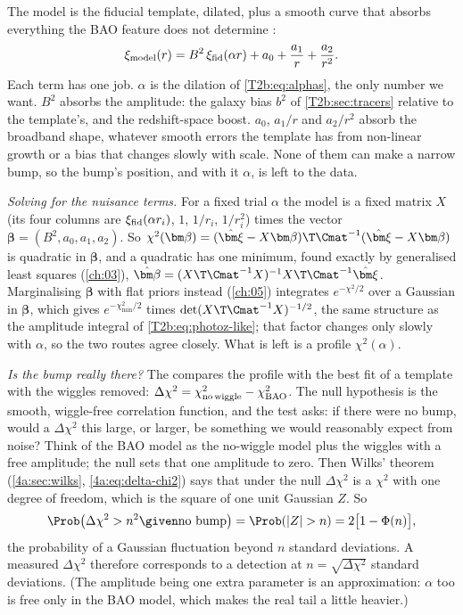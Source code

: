 The model is the fiducial template, dilated, plus a smooth curve that absorbs everything the BAO feature does not determine \cite[p.~9]{DESI2024VI}:
\begin{equation}
  \xi_{\rm model}(r)=B^2\,\xi_{\rm fid}(\alpha r)+a_0+\frac{a_1}{r}+\frac{a_2}{r^2}.
  \label{T2b:eq:bao-model}
\end{equation}
Each term has one job. $\alpha$ is the dilation of \eqref{T2b:eq:alphas}, the only number we want. $B^2$ absorbs the amplitude: the galaxy bias $b^2$ of \cref{T2b:sec:tracers} relative to the template's, and the redshift-space boost. $a_0$, $a_1/r$ and $a_2/r^2$ absorb the broadband shape, whatever smooth errors the template has from non-linear growth or a bias that changes slowly with scale. None of them can make a narrow bump, so the bump's position, and with it $\alpha$, is left to the data.

\emph{Solving for the nuisance terms.} For a fixed trial $\alpha$ the model is a fixed matrix $X$ (its four columns are $\xi_{\rm fid}(\alpha r_i)$, $1$, $1/r_i$, $1/r_i^2$) times the vector $\bm\beta=(B^2,a_0,a_1,a_2)$. So $\chi^2(\bm\beta)=(\hat{\bm\xi}-X\bm\beta)\T\Cmat^{-1}(\hat{\bm\xi}-X\bm\beta)$ is quadratic in $\bm\beta$, and a quadratic has one minimum, found exactly by generalised least squares (\cref{ch:03}), $\hat{\bm\beta}=(X\T\Cmat^{-1}X)^{-1}X\T\Cmat^{-1}\hat{\bm\xi}$. Marginalising $\bm\beta$ with flat priors instead (\cref{ch:05}) integrates $e^{-\chi^2/2}$ over a Gaussian in $\bm\beta$, which gives $e^{-\chi^2_{\min}/2}$ times $\det(X\T\Cmat^{-1}X)^{-1/2}$, the same structure as the amplitude integral of \eqref{T2b:eq:photoz-like}; that factor changes only slowly with $\alpha$, so the two routes agree closely. What is left is a profile $\chi^2(\alpha)$.

\emph{Is the bump really there?} The  compares the profile with the best fit of a template with the wiggles removed: $\Delta\chi^2=\chi^2_{\rm no\,wiggle}-\chi^2_{\rm BAO}$. The null hypothesis is the smooth, wiggle-free correlation function, and the test asks: if there were no bump, would a $\Delta\chi^2$ this large, or larger, be something we would reasonably expect from noise? Think of the BAO model as the no-wiggle model plus the wiggles with a free amplitude; the null sets that one amplitude to zero. Then Wilks' theorem (\cref{4a:sec:wilks}, \eqref{4a:eq:delta-chi2}) says that under the null $\Delta\chi^2$ is a $\chi^2$ with one degree of freedom, which is the square of one unit Gaussian $Z$. So
\[
  \Prob\big(\Delta\chi^2>n^2\given\text{no bump}\big)=\Prob(|Z|>n)=2\big[1-\Phi(n)\big],
\]
the probability of a Gaussian fluctuation beyond $n$ standard deviations. A measured $\Delta\chi^2$ therefore corresponds to a detection at $n=\sqrt{\Delta\chi^2}$ standard deviations. (The amplitude being one extra parameter is an approximation: $\alpha$ too is free only in the BAO model, which makes the real tail a little heavier.)

